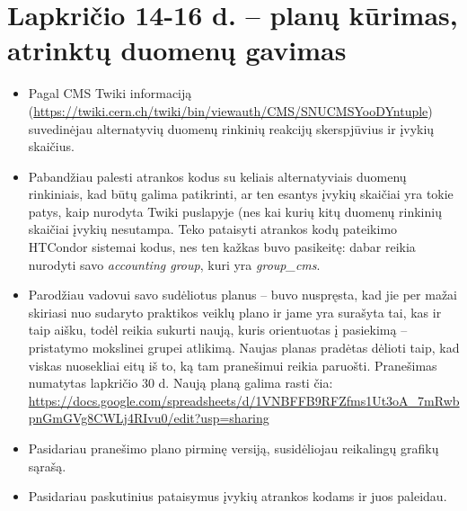 \documentclass[a4paper, 12pt]{article}
\begin{document}
\section{Lapkričio 14-16 d. -- planų kūrimas, atrinktų duomenų gavimas}
\begin{itemize}
	\item Pagal CMS Twiki informaciją (\url{https://twiki.cern.ch/twiki/bin/viewauth/CMS/SNUCMSYooDYntuple})
	suvedinėjau alternatyvių duomenų rinkinių reakcijų skerspjūvius	ir įvykių skaičius.
	\item Pabandžiau palesti atrankos kodus su keliais alternatyviais duomenų rinkiniais, kad būtų galima
	patikrinti, ar ten esantys įvykių skaičiai yra tokie patys, kaip nurodyta Twiki puslapyje (nes kai
	kurių kitų duomenų rinkinių skaičiai įvykių nesutampa. Teko pataisyti atrankos kodų pateikimo
	HTCondor sistemai kodus, nes ten kažkas buvo pasikeitę: dabar reikia nurodyti savo
	\textit{accounting group}, kuri yra \textit{group\_cms}.
	\item Parodžiau vadovui savo sudėliotus planus -- buvo nuspręsta, kad jie per mažai skiriasi nuo
	sudaryto praktikos veiklų plano ir jame yra surašyta tai, kas ir taip aišku, todėl reikia sukurti
	naują, kuris orientuotas į pasiekimą -- pristatymo mokslinei grupei atlikimą. Naujas planas pradėtas
	dėlioti taip, kad viskas nuosekliai eitų iš to,	ką tam pranešimui reikia paruošti. Pranešimas
	numatytas lapkričio 30 d. Naują planą galima rasti čia:
	\url{https://docs.google.com/spreadsheets/d/1VNBFFB9RFZfms1Ut3oA_7mRwbpnGmGVg8CWLj4RIvu0/edit?usp=sharing}
	\item Pasidariau pranešimo plano pirminę versiją, susidėliojau reikalingų grafikų sąrašą.
	\item Pasidariau paskutinius pataisymus įvykių atrankos kodams ir juos paleidau.
\end{itemize}
\end{document}
